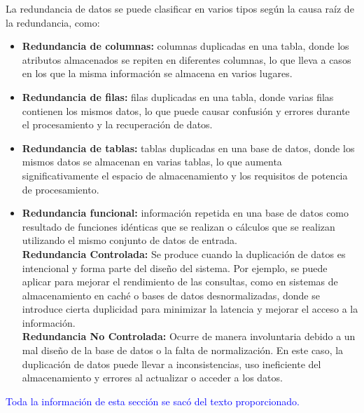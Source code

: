 La redundancia de datos se puede clasificar en varios tipos según la causa raíz de la redundancia, como:
\begin{itemize}
    \item \textbf{Redundancia de columnas:} columnas duplicadas en una tabla, donde los atributos almacenados se repiten en diferentes columnas, lo que lleva a casos en los que la misma información se almacena en varios lugares. \\
    
    \item \textbf{Redundancia de filas:} filas duplicadas en una tabla, donde varias filas contienen los mismos datos, lo que puede causar confusión y errores durante el procesamiento y la recuperación de datos. \\
    
    \item \textbf{Redundancia de tablas:} tablas duplicadas en una base de datos, donde los mismos datos se almacenan en varias tablas, lo que aumenta significativamente el espacio de almacenamiento y los requisitos de potencia de procesamiento. \\
    
    \item \textbf{Redundancia funcional:} información repetida en una base de datos como resultado de funciones idénticas que se realizan o cálculos que se realizan utilizando el mismo conjunto de datos de entrada. \\

    \textbf{Redundancia Controlada: }Se produce cuando la duplicación de datos es intencional y forma parte del diseño del sistema. Por ejemplo, se puede aplicar para mejorar el rendimiento de las consultas, como en sistemas de almacenamiento en caché o bases de datos desnormalizadas, donde se introduce cierta duplicidad para minimizar la latencia y mejorar el acceso a la información.\\
    
    \textbf{Redundancia No Controlada: } Ocurre de manera involuntaria debido a un mal diseño de la base de datos o la falta de normalización. En este caso, la duplicación de datos puede llevar a inconsistencias, uso ineficiente del almacenamiento y errores al actualizar o acceder a los datos.
\end{itemize}

\textcolor{blue}{Toda la información de esta sección se sacó del texto proporcionado. \cite{Appmaster}
}

